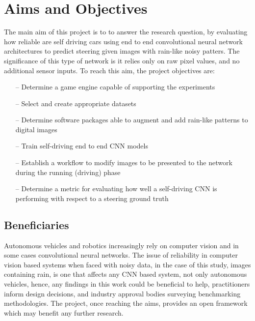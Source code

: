 \section{Aims and Objectives}


The main aim of this project is to to answer the research question, by evaluating how reliable are self driving cars using end to end convolutional neural network architectures to predict steering given images with rain-like noisy patters. The significance of this type of network is it relies only on raw pixel values, and no additional sensor inputs. 
To reach this aim, the project objectives are:
\begin{itemize}
    \item[--] Determine a game engine capable of supporting the experiments 
    \item[--] Select and create appropriate datasets 
    \item[--] Determine software packages able to augment and add rain-like patterns to digital images
    \item[--] Train self-driving end to end CNN models    
    \item[--] Establish a workflow to modify images to be presented to the network during the running (driving) phase
    \item[--] Determine a metric for evaluating how well a self-driving CNN is performing with respect to a steering ground truth    
\end{itemize}

\subsection{Beneficiaries}


Autonomous vehicles and robotics increasingly rely on computer vision and in some cases convolutional neural networks. The issue of reliability in computer vision based systems when faced with noisy data, in the case of this study, images containing rain, is one that affects any CNN based system, not only autonomous vehicles, hence, any findings in this work could be beneficial to help, practitioners inform design decisions, and industry approval bodies surveying benchmarking methodologies. The project, once reaching the aims, provides an open framework which may benefit any further research.

